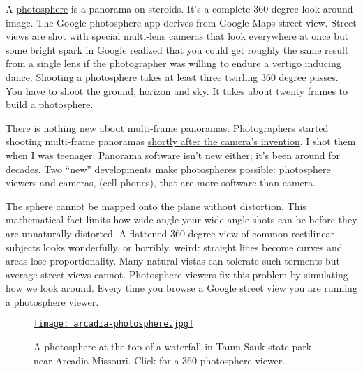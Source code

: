 A
\href{https://www.google.com/maps/about/contribute/photosphere/}{photosphere}
is a panorama on steroids. It's a complete 360 degree look around image.
The Google photosphere app derives from Google Maps street view. Street
views are shot with special multi-lens cameras that look everywhere at
once but some bright spark in Google realized that you could get roughly
the same result from a single lens if the photographer was willing to
endure a vertigo inducing dance. Shooting a photosphere takes at least
three twirling 360 degree passes. You have to shoot the ground, horizon
and sky. It takes about twenty frames to build a photosphere.

There is nothing new about multi-frame panoramas. Photographers started
shooting multi-frame panoramas
\href{https://content.lib.washington.edu/panoramweb/history.html}{shortly
after the camera's invention}. I shot them when I was teenager. Panorama
software isn't new either; it's been around for decades. Two ``new''
developments make photospheres possible: photosphere viewers and cameras,
(cell phones), that are more software than camera.





The sphere cannot be mapped onto the plane without distortion. This
mathematical fact limits how wide-angle your wide-angle shots can be
before they are unnaturally distorted. A flattened 360 degree view of
common rectilinear subjects looks wonderfully, or horribly, weird:
straight lines become curves and areas lose proportionality. Many
natural vistas can tolerate such torments but average street views
cannot. Photosphere viewers fix this problem by simulating how we look
around. Every time you browse a Google street view you are running a
photosphere viewer.


\begin{figure}[htbp]
\centering
\href{https://www.google.com/maps/views/view/109459250977988268850/gphoto/6071702564097759170}{\texttt{[image: arcadia-photosphere.jpg]}}
\caption{A photosphere at the top of a waterfall in Taum Sauk state park near Arcadia Missouri.
Click for a 360 photosphere viewer.}
\label{fig:4832X0}
\end{figure}


